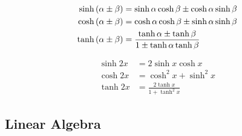 \begin{multicols}{2}
\begin{CheatsheetEntryFrame}
        \begin{align*}
            \sinh{\parens*{\alpha \pm \beta}} &= \sinh{\alpha} \cosh{\beta } \pm \cosh{\alpha} \sinh{\beta } \\
            \cosh{\parens*{\alpha \pm \beta}} &= \cosh{\alpha} \cosh{\beta } \pm \sinh{\alpha} \sinh{\beta } \\
            \tanh{\parens*{\alpha \pm \beta}} &= \frac{\tanh{\alpha} \pm \tanh{\beta}}{1 \pm \tanh{\alpha} \tanh{\beta}}
        \end{align*}

        \begin{align*}
            \sinh{2x} &= 2 \sinh{x} \cosh{x} \\
            \cosh{2x} &= \cosh^2{x} + \sinh^2{x} \\
            \tanh{2x} &= \frac{2 \tanh{x}}{1 + \tanh^2{x}}
        \end{align*}

    \end{CheatsheetEntryFrame}

\end{multicols}


\newpage
\subsection{Linear Algebra}%
\label{sub:linear-algebra}


